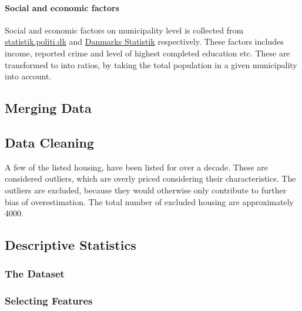 \documentclass[12pt,a4paper]{article}
\begin{document}
\paragraph{Social and economic factors\newline}
Social and economic factors on municipality level is collected from \href{https://statistik.politi.dk/QvAJAXZfc/opendoc.htm?document=QlikApplication%2F2999_Public\%2FPublic_IndsatsResultater.qvw}{statistik.politi.dk} and  
\href{https://www.dst.dk/da/Statistik/emner/befolkning-og-valg}{Danmarks Statistik} respectively. These factors includes income, reported crime and level of highest completed education etc. These are transformed to into ratios, by taking the total population in a given municipality into account.   
\subsection{Merging Data}

\subsection{Data Cleaning}

A few of the listed housing, have been listed for over a decade. These are considered outliers, which are overly priced considering their characteristics. The outliers are excluded, because they would otherwise only contribute to further bias of overestimation. The total number of excluded housing are approximately 4000.  

\subsection{Descriptive Statistics}
\subsubsection{The Dataset}
\subsubsection{Selecting Features}
\end{document}
